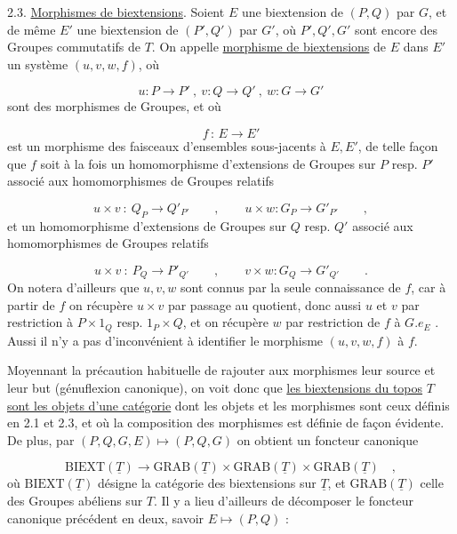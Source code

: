 2.3. \underline{Morphismes de biextensions}. Soient $E$ une biextension de $(P,Q)$ par $G$, et de même $E'$ une biextension de $(P',Q')$ par $G'$, où $P',Q',G'$ sont encore des Groupes commutatifs de \underline{$T$}. On appelle \underline{morphisme de biextensions} de $E$ dans $E'$ un système $(u,v,w,f)$, où

\begin{equation}\tag{2.3.1}
u:P \longrightarrow P' \ , \ v:Q \longrightarrow Q' \ , \ w:G \longrightarrow G'
\end{equation}
sont des morphismes de Groupes, et où

\begin{equation}\tag{2.3.2}
f \, : \, E \longrightarrow E'
\end{equation}
est un morphisme des faisceaux d'ensembles sous-jacents à $E,E'$, de telle façon que $f$ soit à la fois un homomorphisme d'extensions de Groupes sur $P$ resp. $P'$ associé aux homomorphismes de Groupes relatifs

\begin{equation*}
u \times v \ : \ Q_{P} \longrightarrow Q'_{P'} \qquad , \qquad u \times w : G_{P} \longrightarrow G'_{P'} \qquad ,
\end{equation*}
et un homomorphisme d'extensions de Groupes sur $Q$ resp. $Q'$ associé aux homomorphismes de Groupes relatifs

\begin{equation*}
u \times v \ : \ P_{Q} \longrightarrow P'_{Q'} \qquad , \qquad v \times w : G_{Q} \longrightarrow G'_{Q'} \qquad .
\end{equation*}
On notera d'ailleurs que $u,v,w$ sont connus par la seule connaissance de $f$, car à partir de $f$ on récupère $u \times v$ par passage au quotient, donc aussi $u$ et $v$ par restriction à $P \times 1_{Q}$ resp. $1_{P} \times Q$, et on récupère $w$ par restriction de $f$ à $G.e_{E}$ . Aussi il n'y a pas d'inconvénient à identifier le morphisme $(u,v,w,f)$ à $f$.

Moyennant la précaution habituelle de rajouter aux morphismes leur source et leur but (génuflexion canonique), on voit donc que \underline{les biextensions du topos} \underline{$T$} \underline{sont les objets d'une catégorie} dont les objets et les morphismes sont ceux définis en 2.1 et 2.3, et où la composition
des morphismes est définie de façon évidente. De plus, par $(P,Q,G,E) \longmapsto (P,Q,G)$ on obtient un foncteur canonique

\begin{equation}\tag{2.3.3}
\mathrm{BIEXT}(\underline{T}) \longrightarrow \mathrm{GRAB}(\underline{T})\times\mathrm{GRAB}(\underline{T})\times\mathrm{GRAB}(\underline{T}) \quad ,
\end{equation}
où $\mathrm{BIEXT}(\underline{T})$ désigne la catégorie des biextensions sur $\underline{T}$, et $\mathrm{GRAB}(\underline{T})$ celle des Groupes abéliens sur $T$. Il y a lieu d'ailleurs de décomposer le foncteur canonique précédent en deux, savoir $E \longmapsto (P,Q)$ :

